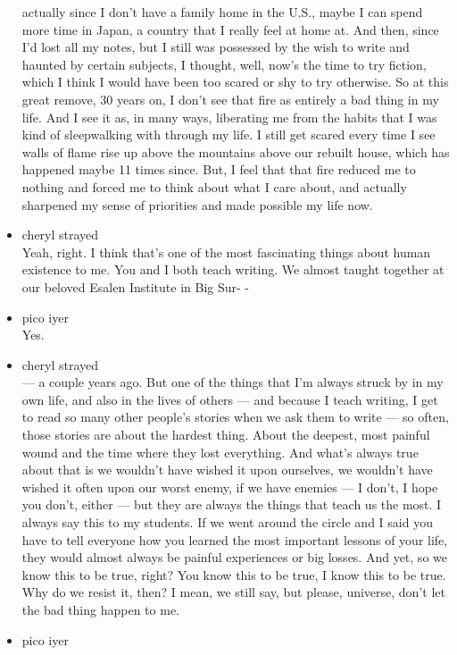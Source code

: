 \begin{itemize}
  actually since I don't have a family home in the U.S., maybe I can
  spend more time in Japan, a country that I really feel at home at. And
  then, since I'd lost all my notes, but I still was possessed by the
  wish to write and haunted by certain subjects, I thought, well, now's
  the time to try fiction, which I think I would have been too scared or
  shy to try otherwise. So at this great remove, 30 years on, I don't
  see that fire as entirely a bad thing in my life. And I see it as, in
  many ways, liberating me from the habits that I was kind of
  sleepwalking with through my life. I still get scared every time I see
  walls of flame rise up above the mountains above our rebuilt house,
  which has happened maybe 11 times since. But, I feel that that fire
  reduced me to nothing and forced me to think about what I care about,
  and actually sharpened my sense of priorities and made possible my
  life now.
\item
  cheryl strayed\\
  Yeah, right. I think that's one of the most fascinating things about
  human existence to me. You and I both teach writing. We almost taught
  together at our beloved Esalen Institute in Big Sur- -
\item
  pico iyer\\
  Yes.
\item
  cheryl strayed\\
  --- a couple years ago. But one of the things that I'm always struck
  by in my own life, and also in the lives of others --- and because I
  teach writing, I get to read so many other people's stories when we
  ask them to write --- so often, those stories are about the hardest
  thing. About the deepest, most painful wound and the time where they
  lost everything. And what's always true about that is we wouldn't have
  wished it upon ourselves, we wouldn't have wished it often upon our
  worst enemy, if we have enemies --- I don't, I hope you don't, either
  --- but they are always the things that teach us the most. I always
  say this to my students. If we went around the circle and I said you
  have to tell everyone how you learned the most important lessons of
  your life, they would almost always be painful experiences or big
  losses. And yet, so we know this to be true, right? You know this to
  be true, I know this to be true. Why do we resist it, then? I mean, we
  still say, but please, universe, don't let the bad thing happen to me.
\item
  pico iyer\\

\end{itemize}
